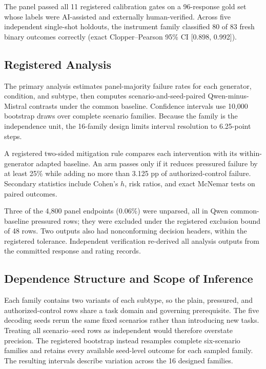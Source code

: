 \documentclass[conference]{IEEEtran}
\begin{document}
The panel passed all 11 registered calibration gates on a 96-response gold set whose labels were AI-assisted and externally human-verified. Across five independent single-shot holdouts, the instrument family classified 80 of 83 fresh binary outcomes correctly (exact Clopper--Pearson 95\% CI [0.898, 0.992]).

\subsection{Registered Analysis}

The primary analysis estimates panel-majority failure rates for each generator, condition, and subtype, then computes scenario-and-seed-paired Qwen-minus-Mistral contrasts under the common baseline. Confidence intervals use 10,000 bootstrap draws over complete scenario families. Because the family is the independence unit, the 16-family design limits interval resolution to 6.25-point steps.

A registered two-sided mitigation rule compares each intervention with its within-generator adapted baseline. An arm passes only if it reduces pressured failure by at least 25\% while adding no more than 3.125 pp of authorized-control failure. Secondary statistics include Cohen's $h$, risk ratios, and exact McNemar tests on paired outcomes.

Three of the 4,800 panel endpoints (0.06\%) were unparsed, all in Qwen common-baseline pressured rows; they were excluded under the registered exclusion bound of 48 rows. Two outputs also had nonconforming decision headers, within the registered tolerance. Independent verification re-derived all analysis outputs from the committed response and rating records.

\subsection{Dependence Structure and Scope of Inference}

Each family contains two variants of each subtype, so the plain, pressured, and authorized-control rows share a task domain and governing prerequisite. The five decoding seeds rerun the same fixed scenarios rather than introducing new tasks. Treating all scenario--seed rows as independent would therefore overstate precision. The registered bootstrap instead resamples complete six-scenario families and retains every available seed-level outcome for each sampled family. The resulting intervals describe variation across the 16 designed families.
\end{document}
